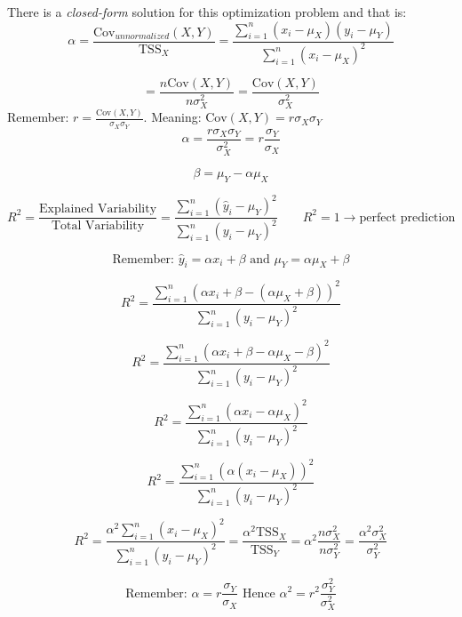 \documentclass{article}
\begin{document}
There is a \textit{closed-form} solution for this optimization problem and that is:
\[
\alpha = \frac{\text{Cov}_{unnormalized}(X,Y)}{\text{TSS}_X} = 
 \frac{\sum_{i=1}^n(x_i - \mu_X)(y_i - \mu_Y)}{\sum_{i=1}^n(x_i - \mu_X)^2}
\]

\[
= \frac{n \text{Cov}(X,Y)}{n \sigma_X^2} = \frac{\text{Cov}(X,Y)}{\sigma_X^2}
\]
Remember: $r = \frac{\text{Cov}(X,Y)}{\sigma_X  \sigma_Y}$. Meaning: $\text{Cov}(X,Y) = r \sigma_X  \sigma_Y$
\[
\alpha = \frac{r \sigma_X  \sigma_Y}{\sigma_X^2} = r\frac{\sigma_Y}{\sigma_X}
\]

\[
\beta = \mu_Y - \alpha \mu_X
\]


\[
    R^2 = \frac{\text{Explained Variability}}{\text{Total Variability}} = \frac{\sum_{i=1}^n (\hat{y}_i - \mu_Y)^2}{\sum_{i=1}^n (y_i - \mu_Y)^2} \qquad R^2 = 1 \to \text{perfect prediction}
\]

\[
\text{Remember: }
\hat{y}_i = \alpha x_i + \beta \text{ and } \mu_Y = \alpha \mu_X + \beta
\]

\[
R^2 = \frac{\sum_{i=1}^n (\alpha x_i + \beta - (\alpha \mu_X + \beta))^2}{\sum_{i=1}^n (y_i - \mu_Y)^2}
\]

\[
R^2 = \frac{\sum_{i=1}^n (\alpha x_i + \beta - \alpha \mu_X - \beta)^2}{\sum_{i=1}^n (y_i - \mu_Y)^2}
\]

\[
R^2 = \frac{\sum_{i=1}^n (\alpha x_i - \alpha \mu_X)^2}{\sum_{i=1}^n (y_i - \mu_Y)^2}
\]

\[
R^2 = \frac{\sum_{i=1}^n (\alpha (x_i - \mu_X))^2}{\sum_{i=1}^n (y_i - \mu_Y)^2}
\]

\[
R^2 = \frac{\alpha^2 \sum_{i=1}^n (x_i - \mu_X)^2}{\sum_{i=1}^n (y_i - \mu_Y)^2} = \frac{\alpha^2 \text{TSS}_X}{\text{TSS}_Y} = \alpha^2 \frac{n \sigma_X^2}{n \sigma_Y^2} = \frac{\alpha^2 \sigma_X^2}{\sigma_Y^2} 
\]

\[
\text{Remember: } \alpha = r\frac{\sigma_Y}{\sigma_X} \text{ Hence }\alpha^2 = r^2 \frac{\sigma_Y^2}{\sigma_X^2}
\]
\end{document}
